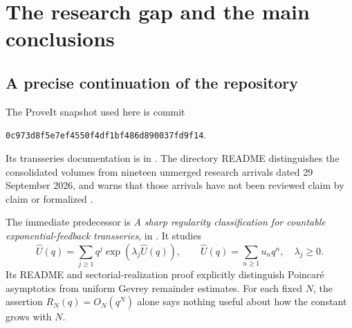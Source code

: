 \documentclass[11pt,a4paper]{article}
\numberwithin{equation}{section}
\theoremstyle{definition}\newtheorem{definition}[theorem]{Definition}
\theoremstyle{remark}\newtheorem{remark}[theorem]{Remark}
\newcommand{\Uhat}{\widehat U}\newcommand{\Qhat}{\widehat Q}\newcommand{\Vhat}{\widehat V}
\begin{document}
\hypersetup{pageanchor=true}
\tableofcontents\clearpage

\section{The research gap and the main conclusions}
\label{sec:intro}
\subsection{A precise continuation of the repository}
The ProveIt snapshot used here is commit
\begin{center}\small\texttt{0c973d8f5e7ef4550f4df1bf486d890037fd9f14}.\end{center}
Its transseries documentation is in
.
The directory README distinguishes the consolidated volumes from nineteen
unmerged research arrivals dated 29 September 2026, and warns that those
arrivals have not been reviewed claim by claim or formalized \cite{repo}.

The immediate predecessor is \emph{A sharp regularity classification for
countable exponential-feedback transseries}, in
 \cite{feedback}.
It studies
\begin{equation}
 \Uhat(q)=\sum_{j\ge1}q^j\exp(\lambda_j\Uhat(q)),\qquad
 \Uhat(q)=\sum_{n\ge1}u_nq^n,\quad \lambda_j\ge0.
 \label{eq:model}
\end{equation}
Its README and sectorial-realization proof explicitly distinguish
Poincar\'e asymptotics from uniform Gevrey remainder estimates. For each
fixed $N$, the assertion $R_N(q)=O_N(q^N)$ alone says nothing useful about
how the constant grows with $N$.
\end{document}
